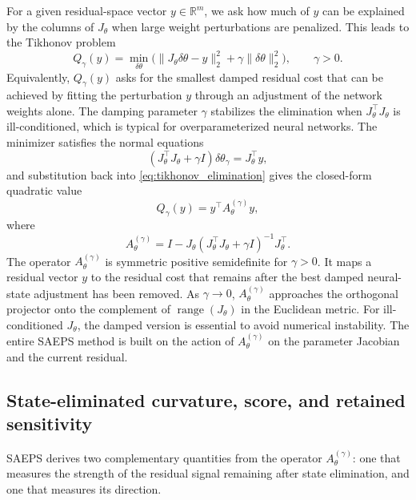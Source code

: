 \documentclass[preprint,12pt]{elsarticle}
\newcommand{\R}{\mathbb{R}}
\begin{document}
For a given residual-space vector $y\in\R^m$, we ask how much of $y$ can be explained by the columns of $J_\theta$ when large weight perturbations are penalized.  This leads to the Tikhonov problem
\begin{equation}
    Q_\gamma(y)
    =\min_{\delta\theta}
    \bigl(
        \|J_\theta\delta\theta-y\|_2^2
        +\gamma\|\delta\theta\|_2^2
    \bigr),
    \qquad \gamma>0.
    \label{eq:tikhonov_elimination}
\end{equation}
Equivalently, $Q_\gamma(y)$ asks for the smallest damped residual cost that can be achieved by fitting the perturbation $y$ through an adjustment of the network weights alone.  The damping parameter $\gamma$ stabilizes the elimination when $J_\theta^\top J_\theta$ is ill-conditioned, which is typical for overparameterized neural networks.  The minimizer satisfies the normal equations
\begin{equation}
    (J_\theta^\top J_\theta+\gamma I)\delta\theta_\gamma = J_\theta^\top y,
\end{equation}
and substitution back into \eqref{eq:tikhonov_elimination} gives the closed-form quadratic value
\begin{equation}
    Q_\gamma(y)=y^\top A_\theta^{(\gamma)} y,
    \label{eq:qgamma_quadratic}
\end{equation}
where
\begin{equation}
    A_\theta^{(\gamma)}
    = I - J_\theta(J_\theta^\top J_\theta+\gamma I)^{-1}J_\theta^\top .
    \label{eq:A_operator}
\end{equation}
The operator $A_\theta^{(\gamma)}$ is symmetric positive semidefinite for $\gamma>0$.  It maps a residual vector $y$ to the residual cost that remains after the best damped neural-state adjustment has been removed.  As $\gamma\to 0$, $A_\theta^{(\gamma)}$ approaches the orthogonal projector onto the complement of $\operatorname{range}(J_\theta)$ in the Euclidean metric.  For ill-conditioned $J_\theta$, the damped version is essential to avoid numerical instability.  The entire SAEPS method is built on the action of $A_\theta^{(\gamma)}$ on the parameter Jacobian and the current residual.

\subsection{State-eliminated curvature, score, and retained sensitivity}

SAEPS derives two complementary quantities from the operator $A_\theta^{(\gamma)}$: one that measures the strength of the residual signal remaining after state elimination, and one that measures its direction.
\end{document}
